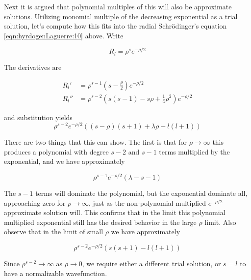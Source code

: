 Next it is argued that polynomial multiples of this will also be approximate solutions.  Utilizing monomial multiple of the decreasing exponential as a trial solution, let's compute how this fits into the radial Schr\"{o}dinger's equation \ref{eqn:hyrdogenLaguerre:10} above.  Write

\begin{equation}\label{eqn:hyrdogenLaguerre:15}
R_l = \rho^s e^{-\rho/2}
\end{equation}

The derivatives are

\begin{align*}
R_l' &= \rho^{s-1} \left( s -\frac{\rho}{2}\right) e^{-\rho/2} \\
R_l'' &= 
\rho^{s-2} 
\left( s (s-1) -s \rho +\frac{1}{4} \rho^2 
\right)
e^{-\rho/2}
\end{align*}

and substitution yields
\begin{equation}\label{eqn:hyrdogenLaguerre:16}
\rho^{s-2} 
e^{-\rho/2}
\left( 
(s - \rho) (s+1) 
+\lambda \rho 
- l(l+1) 
\right)
\end{equation}

There are two things that this can show.  The first is that for $\rho \rightarrow \infty$ this produces a polynomial with degree $s-2$ and $s-1$ terms multiplied by the exponential, and we have approximately

\begin{equation}\label{eqn:hyrdogenLaguerre:17}
\rho^{s-1} 
e^{-\rho/2}
(\lambda - s - 1)
\end{equation}

The $s-1$ terms will dominate the polynomial, but the exponential dominate all, approaching zero for $\rho \rightarrow \infty$, just as the non-polynomial multiplied $e^{-\rho/2}$ approximate solution will.  This confirms that in the limit this polynomial multiplied exponential still has the desired behavior in the large $\rho$ limit.  Also observe that in the limit of small $\rho$ we have approximately

\begin{equation}\label{eqn:hyrdogenLaguerre:18}
\rho^{s-2} 
e^{-\rho/2}
\left( 
s (s+1) - l(l+1) 
\right)
\end{equation}

Since $\rho^{s-2} \rightarrow \infty$ as $\rho \rightarrow 0$, we require either a different trial solution, or $s=l$ to have a normalizable wavefunction.


